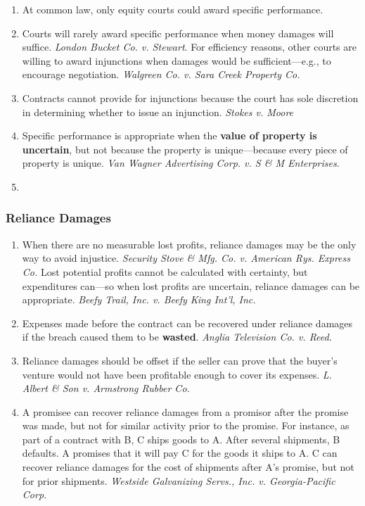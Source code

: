 \begin{enumerate}
    \item At common law, only equity courts could award specific performance.
    \item Courts will rarely award specific performance when money damages 
    will suffice. \emph{London Bucket Co. v. Stewart}. For efficiency reasons, 
    other courts are willing to award injunctions when damages would be 
    sufficient---e.g., to encourage negotiation. \emph{Walgreen Co. v. Sara 
    Creek Property Co.}
    \item Contracts cannot provide for injunctions because the court has sole 
    discretion in determining whether to issue an injunction. \emph{Stokes v. 
    Moore}
    \item Specific performance is appropriate when the \textbf{value of property is 
    uncertain}, but not because the property is unique---because every piece 
    of property is unique.  \emph{Van Wagner Advertising Corp. v. S \& M 
    Enterprises}.
    \item %
\end{enumerate}

\subsubsection{Reliance Damages}

\begin{enumerate}
    \item When there are no measurable lost profits, reliance damages may be 
    the only way to avoid injustice. \emph{Security Stove \& Mfg. Co. v. 
    American Rys. Express Co.} Lost potential profits cannot be calculated 
    with certainty, but expenditures can---so when lost profits are uncertain, 
    reliance damages can be appropriate. \emph{Beefy Trail, Inc. v. Beefy King 
    Int'l, Inc.}
    \item Expenses made before the contract can be recovered under reliance 
    damages if the breach caused them to be \textbf{wasted}. \emph{Anglia 
    Television Co. v. Reed}.
    \item Reliance damages should be offset if the seller can prove that 
    the buyer's venture would not have been profitable enough to cover its 
    expenses. \emph{L. Albert \& Son v. Armstrong Rubber Co.}
    \item A promisee can recover reliance damages from a promisor after the 
    promise was made, but not for similar activity prior to the promise. For 
    instance, as part of a contract with B, C ships goods to A. After several 
    shipments, B defaults. A promises that it will pay C for the goods it 
    ships to A. C can recover reliance damages for the cost of shipments after 
    A's promise, but not for prior shipments. \emph{Westside Galvanizing 
    Servs., Inc. v. Georgia-Pacific Corp.}
\end{enumerate}

